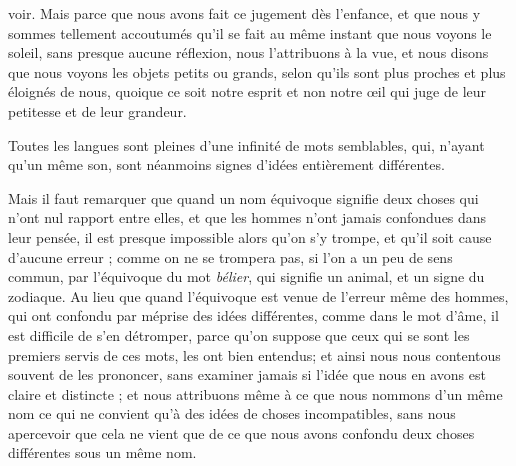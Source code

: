 voir. Mais parce que nous avons fait ce jugement dès l'enfance, et que nous y sommes tellement accoutumés qu'il se fait au même instant que nous voyons le soleil, sans presque aucune réflexion, nous l'attribuons à la vue, et nous disons que nous voyons les objets petits ou grands, selon qu'ils sont plus proches et plus éloignés de nous, quoique ce soit notre esprit et non notre œil qui juge de leur petitesse et de leur grandeur.

Toutes les langues sont pleines d'une infinité de mots semblables, qui, n'ayant qu'un même son, sont néanmoins signes d'idées entièrement différentes.

Mais il faut remarquer que quand un nom équivoque signifie deux choses qui n'ont nul rapport entre elles, et que les hommes n'ont jamais confondues dans leur pensée, il est presque impossible alors qu'on s'y trompe, et qu'il soit cause d'aucune erreur ; comme on ne se trompera pas, si l'on a un peu de sens commun, par l'équivoque du mot \emph{bélier}, qui signifie un animal, et un signe du zodiaque. Au lieu que quand l'équivoque est venue de l'erreur même des hommes, qui ont confondu par méprise des idées différentes, comme dans le mot d'âme, il est difficile de s'en détromper, parce qu'on suppose que ceux qui se sont les premiers servis de ces mots, les ont bien entendus; et ainsi nous nous contentous souvent de les prononcer, sans examiner jamais si l'idée que nous en avons est claire et distincte ; et nous attribuons même à ce que nous nommons d'un même nom ce qui ne convient qu'à des idées de choses incompatibles, sans nous apercevoir que cela ne vient que de ce que nous avons confondu deux choses différentes sous un même nom.

